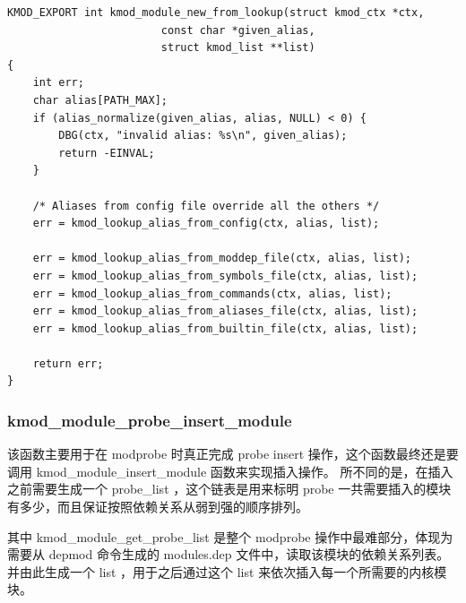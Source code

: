 \documentclass[11pt,a4paper]{article}
\begin{document}
{\begin{shaded}\begin{verbatim}
KMOD_EXPORT int kmod_module_new_from_lookup(struct kmod_ctx *ctx,
                        const char *given_alias,
                        struct kmod_list **list)
{
    int err;
    char alias[PATH_MAX];
    if (alias_normalize(given_alias, alias, NULL) < 0) {
        DBG(ctx, "invalid alias: %s\n", given_alias);
        return -EINVAL;
    }

    /* Aliases from config file override all the others */
    err = kmod_lookup_alias_from_config(ctx, alias, list);

    err = kmod_lookup_alias_from_moddep_file(ctx, alias, list);
    err = kmod_lookup_alias_from_symbols_file(ctx, alias, list);
    err = kmod_lookup_alias_from_commands(ctx, alias, list);
    err = kmod_lookup_alias_from_aliases_file(ctx, alias, list);
    err = kmod_lookup_alias_from_builtin_file(ctx, alias, list);

    return err;
}
\end{verbatim}\end{shaded}}
\subsubsection{kmod\_module\_probe\_insert\_module}

该函数主要用于在 modprobe 时真正完成 probe insert
操作，这个函数最终还是要调用 kmod\_module\_insert\_module
函数来实现插入操作。 所不同的是，在插入之前需要生成一个 probe\_list
，这个链表是用来标明 probe
一共需要插入的模块有多少，而且保证按照依赖关系从弱到强的顺序排列。

其中 kmod\_module\_get\_probe\_list 是整个 modprobe
操作中最难部分，体现为需要从 depmod 命令生成的 modules.dep
文件中，读取该模块的依赖关系列表。 并由此生成一个 list ，用于之后通过这个
list 来依次插入每一个所需要的内核模块。
\end{document}
